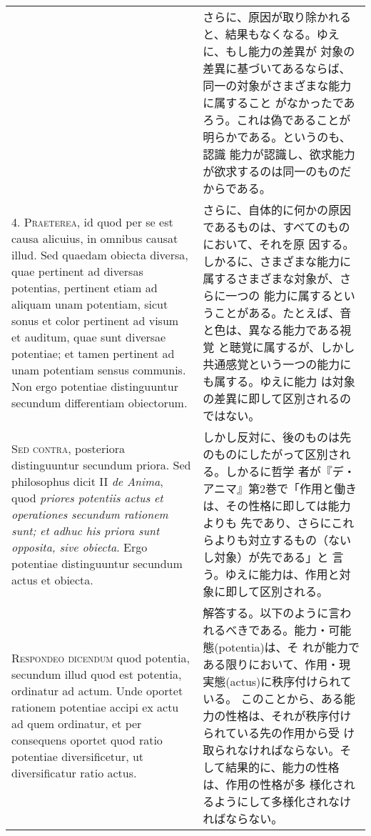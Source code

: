 \documentclass[paper=a4paper,fontsize=10pt,jafontsize=9pt,titlepage]{jlreq}
\begin{document}
\begin{longtable}{p{21em}p{21em}}
 
&

さらに、原因が取り除かれると、結果もなくなる。ゆえに、もし能力の差異が
対象の差異に基づいてあるならば、同一の対象がさまざまな能力に属すること
がなかったであろう。これは偽であることが明らかである。というのも、認識
能力が認識し、欲求能力が欲求するのは同一のものだからである。


\\


4. {\scshape Praeterea}, id quod per se est causa alicuius, in omnibus
causat illud. Sed quaedam obiecta diversa, quae pertinent ad diversas
potentias, pertinent etiam ad aliquam unam potentiam, sicut sonus et
color pertinent ad visum et auditum, quae sunt diversae potentiae; et
tamen pertinent ad unam potentiam sensus communis. Non ergo potentiae
distinguuntur secundum differentiam obiectorum.

 
&

さらに、自体的に何かの原因であるものは、すべてのものにおいて、それを原
因する。しかるに、さまざまな能力に属するさまざまな対象が、さらに一つの
能力に属するということがある。たとえば、音と色は、異なる能力である視覚
と聴覚に属するが、しかし共通感覚という一つの能力にも属する。ゆえに能力
は対象の差異に即して区別されるのではない。

\\

 {\scshape Sed contra}, posteriora distinguuntur secundum priora. Sed
 philosophus dicit II {\itshape de Anima}, quod {\itshape priores
 potentiis actus et operationes secundum rationem sunt; et adhuc his
 priora sunt opposita, sive obiecta}. Ergo potentiae distinguuntur
 secundum actus et obiecta.
 
&

 しかし反対に、後のものは先のものにしたがって区別される。しかるに哲学
 者が『デ・アニマ』第2巻で「作用と働きは、その性格に即しては能力よりも
 先であり、さらにこれらよりも対立するもの（ないし対象）が先である」と
 言う。ゆえに能力は、作用と対象に即して区別される。


\\

 {\scshape Respondeo dicendum} quod potentia, secundum illud quod est
 potentia, ordinatur ad actum. Unde oportet rationem potentiae accipi
 ex actu ad quem ordinatur, et per consequens oportet quod ratio
 potentiae diversificetur, ut diversificatur ratio actus.

&

解答する。以下のように言われるべきである。能力・可能態(potentia)は、そ
れが能力である限りにおいて、作用・現実態(actus)に秩序付けられている。
このことから、ある能力の性格は、それが秩序付けられている先の作用から受
け取られなければならない。そして結果的に、能力の性格は、作用の性格が多
様化されるようにして多様化されなければならない。


\end{longtable}
\end{document}
